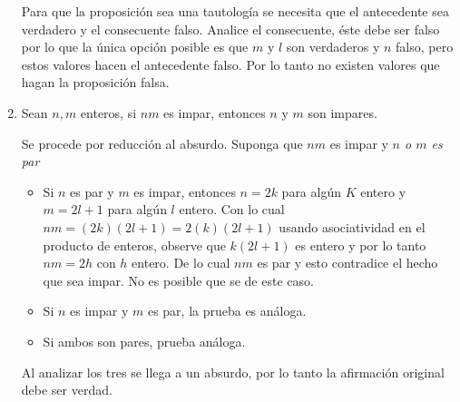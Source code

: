 \begin{enumerate}
    \begin{solucion}
    Para que la proposición sea una tautología se necesita que el antecedente sea verdadero y el consecuente falso. Analice el consecuente, éste debe ser falso por lo que la única opción posible es que $m$ y $l$ son verdaderos y $n$ falso, pero estos valores hacen el antecedente falso. Por lo tanto no existen valores que hagan la proposición falsa.

    \end{solucion}

    \item Sean $n,m$ enteros, si $nm$ es impar, entonces $n$ y $m$ son impares.

    \begin{solucion}
        Se procede por reducción al absurdo. Suponga que $nm$ es impar y \emph{ $n$ o $m$ es par}
        \begin{itemize}
            \item Si $n$ es par y $m$ es impar, entonces $n = 2k $ para algún $K$ entero y $m = 2l+1$ para algún $l$ entero. Con lo cual $nm = (2k)(2l+1) = 2(k)(2l+1)$ usando asociatividad en el producto de enteros, observe que $k(2l+1)$ es entero y por lo tanto $nm = 2h$ con $h$ entero. De lo cual $nm$ es par y esto contradice el hecho que sea impar. No es posible que se de este caso.

            \item Si $n$ es impar y $m$ es par, la prueba es análoga.
            \item Si ambos son pares, prueba análoga.
        \end{itemize}

        Al analizar los tres se llega a un absurdo, por lo tanto la afirmación original debe ser verdad.
    \end{solucion}
\end{enumerate}


